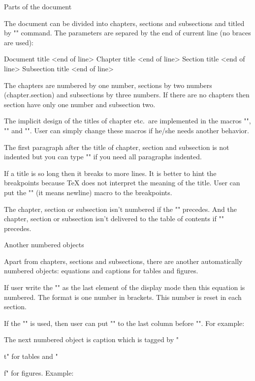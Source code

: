 \sec Parts of the document

The document can be divided into chapters, sections and subsections and titled
by "\tit" command. The parameters are separed by the end of current line (no
braces are used):

\begtt
\tit Document title <end of line>
\chap Chapter title <end of line>
\sec Section title <end of line>
\secc Subsection title <end of line>
\endtt

The chapters are numbered by one number, sections by two numbers
(chapter.section) and subsections by three numbers. If there are no chapters
then section have only one number and subsection two.

The implicit design of the titles of chapter etc.\ are implemented in the
macros "\printchap", "\printsec" and "\printsecc". User can simply change
these macros if he/she needs another behavior.

The first paragraph after the title of chapter, section and subsection is
not indented but you can type "\let\firstnoindent=\relax" if you need all
paragraphs indented.

If a title is so long then it breaks to more lines. It is better to hint the
breakpoints because \TeX{} does not interpret the meaning of the title.
User can put the "\nl" (it means newline) macro to the breakpoints.

The chapter, section or subsection isn't numbered if the "\nonum" precedes.
And the chapter, section or subsection isn't delivered to the table of
contents if "\notoc" precedes.


\sec Another numbered objects

Apart from chapters, sections and subsections, there are another
automatically numbered objects: equations and captions for tables and
figures.

If user write the "\eqmark" as the last element of the display mode then
this equation is numbered. The format is one number in brackets. This number
is reset in each section. 

If the "\eqalignno" is used, then user can put "\eqmark" to the last column
before "\cr". For example:

\begtt
{}
\endtt

The next numbered object is caption which is tagged by "\caption/t" for
tables and "\caption/f" for figures. Example:

